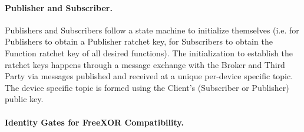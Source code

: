 
\paragraph{Publisher and Subscriber.}


Publishers and Subscribers follow a state machine to initialize themselves
(i.e. for Publishers to obtain a Publisher ratchet key, for Subscribers to
obtain the Function ratchet key of all desired functions).  The initialization
to establish the ratchet keys happens through a message exchange with the
Broker and Third Party via \MQTT messages published and received at a unique
per-device specific topic.  The device specific topic is formed using the
Client's (Subscriber or Publisher) public key.

\paragraph{Identity Gates for FreeXOR Compatibility.}




